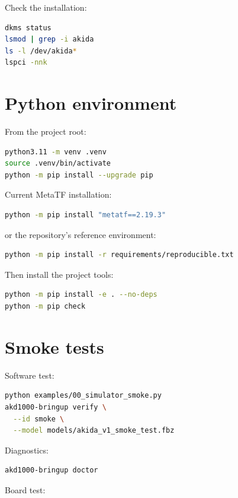 Check the installation:

\begin{lstlisting}[language=bash]
dkms status
lsmod | grep -i akida
ls -l /dev/akida*
lspci -nnk
\end{lstlisting}

\section{Python environment}

From the project root:

\begin{lstlisting}[language=bash]
python3.11 -m venv .venv
source .venv/bin/activate
python -m pip install --upgrade pip
\end{lstlisting}

Current MetaTF installation:

\begin{lstlisting}[language=bash]
python -m pip install "metatf==2.19.3"
\end{lstlisting}

or the repository's reference environment:

\begin{lstlisting}[language=bash]
python -m pip install -r requirements/reproducible.txt
\end{lstlisting}

Then install the project tools:

\begin{lstlisting}[language=bash]
python -m pip install -e . --no-deps
python -m pip check
\end{lstlisting}

\section{Smoke tests}

Software test:

\begin{lstlisting}[language=bash]
python examples/00_simulator_smoke.py
akd1000-bringup verify \
  --id smoke \
  --model models/akida_v1_smoke_test.fbz
\end{lstlisting}

Diagnostics:

\begin{lstlisting}[language=bash]
akd1000-bringup doctor
\end{lstlisting}

Board test:

